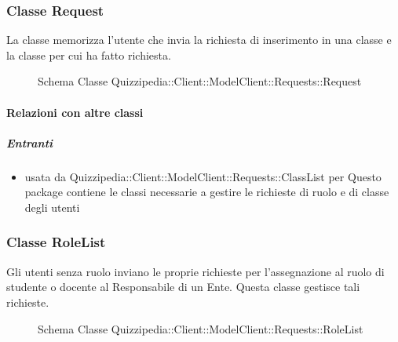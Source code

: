 \subsubsection{Classe Request}
La classe memorizza l'utente che invia la richiesta di inserimento in una classe e la classe per cui ha fatto richiesta.
\begin{figure}[H]
\centering
\noindent{}
\caption[Schema Classe Request]{Schema Classe Quizzipedia::Client::ModelClient::Requests::Request}
\end{figure}
\paragraph{Relazioni con altre classi}
\subparagraph{Entranti}
\begin{itemize}
\item usata da Quizzipedia::Client::ModelClient::Requests::ClassList per Questo package contiene le classi necessarie a gestire le richieste di ruolo e di classe degli utenti
\end{itemize}
\subsubsection{Classe RoleList}
Gli utenti senza ruolo inviano le proprie richieste per l'assegnazione al ruolo di studente o docente al Responsabile di un Ente. Questa classe gestisce tali richieste.
\begin{figure}[H]
\centering
\noindent{}
\caption[Schema Classe RoleList]{Schema Classe Quizzipedia::Client::ModelClient::Requests::RoleList}
\end{figure}
